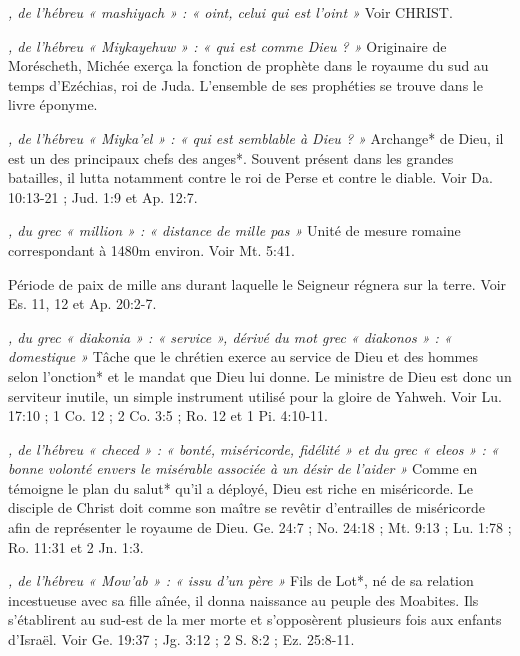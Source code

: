 \begin{multicols}{2}
\textit{, de l'hébreu « mashiyach » : « oint, celui qui est l'oint »}\newline
Voir CHRIST.

\textit{, de l'hébreu « Miykayehuw » : « qui est comme Dieu ? »}\newline
Originaire de Moréscheth, Michée exerça la fonction de prophète dans le royaume du sud au temps d'Ezéchias, roi de Juda. L'ensemble de ses prophéties se trouve dans le livre éponyme.

\textit{, de l'hébreu « Miyka'el » : « qui est semblable à Dieu ? »}\newline
Archange* de Dieu, il est un des principaux chefs des anges*. Souvent présent dans les grandes batailles, il lutta notamment contre le roi de Perse et contre le diable. Voir Da. 10:13-21 ; Jud. 1:9 et Ap. 12:7.

\textit{, du grec « million » : « distance de mille pas »}\newline
Unité de mesure romaine correspondant à 1480m environ. Voir Mt. 5:41.

\textit{}\newline
Période de paix de mille ans durant laquelle le Seigneur régnera sur la terre. Voir Es. 11, 12 et Ap. 20:2-7.

\textit{, du grec « diakonia » : « service », dérivé du mot grec « diakonos » : « domestique »}\newline
Tâche que le chrétien exerce au service de Dieu et des hommes selon l'onction* et le mandat que Dieu lui donne. Le ministre de Dieu est donc un serviteur inutile, un simple instrument utilisé pour la gloire de Yahweh. Voir Lu. 17:10 ; 1 Co. 12 ; 2 Co. 3:5 ; Ro. 12 et 1 Pi. 4:10-11.

\textit{, de l'hébreu « checed » : « bonté, miséricorde, fidélité » et du grec « eleos » : « bonne volonté envers le misérable associée à un désir de l'aider »}\newline
Comme en témoigne le plan du salut* qu'il a déployé, Dieu est riche en miséricorde. Le disciple de Christ doit comme son maître se revêtir d'entrailles de miséricorde afin de représenter le royaume de Dieu. Ge. 24:7 ; No. 24:18 ; Mt. 9:13 ; Lu. 1:78 ; Ro. 11:31 et 2 Jn. 1:3.

\textit{, de l'hébreu « Mow'ab » : « issu d'un père »}\newline
Fils de Lot*, né de sa relation incestueuse avec sa fille aînée, il donna naissance au peuple des Moabites. Ils s'établirent au sud-est de la mer morte et s'opposèrent plusieurs fois aux enfants d'Israël. Voir Ge. 19:37 ; Jg. 3:12 ; 2 S. 8:2 ; Ez. 25:8-11.


\end{multicols}
